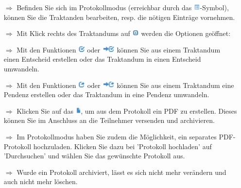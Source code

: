 \documentclass{article}
\begin{document}
\begin{multicols}{2}

\begin{tcolorbox}[colback=blue!5,colframe=blue!40!black,title=Das Protokoll führen]
\begin{itemize}
  \item[$\Longrightarrow$] Befinden Sie sich im Protokollmodus (erreichbar durch das \includegraphics[height=10pt]{Icons/Listensymbol.jpg}-Symbol), können Sie die Traktanden bearbeiten, resp. die nötigen Einträge vornehmen.
	\item[$\Longrightarrow$] Mit Klick rechts des Traktandums auf \includegraphics[height=10pt]{Icons/eingeklappt.jpg} werden die Optionen geöffnet:
  \item[$\Longrightarrow$] Mit den Funktionen \includegraphics[height=10pt]{Icons/Gutzeichen_Rahmen.jpg} oder \includegraphics[height=10pt]{Icons/Pfeil_Gutzeichen.jpg} können Sie aus einem Traktandum einen Entscheid erstellen oder das Traktandum in einen Entscheid umwandeln.
	  \item[$\Longrightarrow$] Mit den Funktionen \includegraphics[height=10pt]{Icons/Pfeil_aus_Box.jpg} oder \includegraphics[height=10pt]{Icons/Pfeil_Pfeil_aus_Box.jpg} können Sie aus einem Traktandum eine Pendenz erstellen oder das Traktandum in eine Pendenz umwandeln.
  \item[$\Longrightarrow$] Klicken Sie auf das \includegraphics[height=10pt]{Icons/Blattsymbol.jpg}, um aus dem Protokoll ein PDF zu erstellen. Dieses können Sie im Anschluss an die Teilnehmer versenden und archivieren.
	\item[$\Longrightarrow$] Im Protokollmodus haben Sie zudem die Möglichkeit, ein separates PDF-Protokoll hochzuladen. Klicken Sie dazu bei 'Protokoll hochladen' auf 'Durchsuchen' und wählen Sie das gewünschte Protokoll aus.
	\item[$\Longrightarrow$] Wurde ein Protokoll archiviert, lässt es sich nicht mehr verändern und auch nicht mehr löschen.
\end{itemize}
\end{tcolorbox}



\end{multicols}
\end{document}
